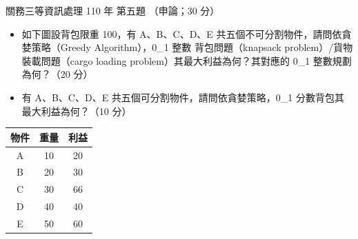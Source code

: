 \begin{pastexam}[label={px:gw3-110-ds-05}]{關務三等資訊處理 110 年 第五題}
（申論；30 分）

\begin{itemize}[leftmargin=2.2em]
\item[㈠] 如下圖設背包限重 100，有 A、B、C、D、E 共五個不可分割物件，請問依貪婪策略（Greedy Algorithm），0\_1 整數
背包問題（knapsack problem）/貨物裝載問題（cargo loading problem）其最大利益為何？其對應的 0\_1 整數規劃為何？（20 分）
\item[㈡] 有 A、B、C、D、E 共五個可分割物件，請問依貪婪策略，0\_1 分數背包其最大利益為何？（10 分）
\end{itemize}
\begin{center}
\begin{tabular}{|c|c|c|}
\hline
物件 & 重量 & 利益 \\
\hline
A & 10 & 20 \\
\hline
B & 20 & 30 \\
\hline
C & 30 & 66 \\
\hline
D & 40 & 40 \\
\hline
E & 50 & 60 \\
\hline
\end{tabular}
\end{center}
\end{pastexam}

